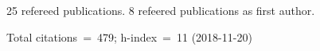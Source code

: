 25 refereed publications. 8 refeered publications as first author.

Total citations~=~479; h-index~=~11 (2018-11-20)